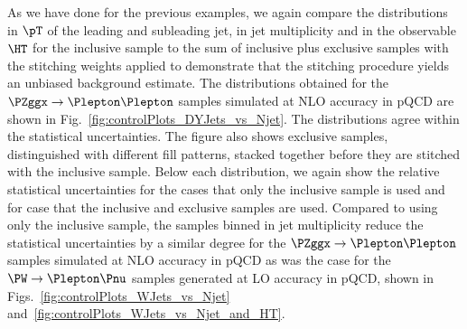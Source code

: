 As we have done for the previous examples, we again compare the distributions in $\pT$ of the leading and subleading jet,
in jet multiplicity and in the observable $\HT$ 
for the inclusive sample to the sum of inclusive plus exclusive samples with the stitching weights applied
to demonstrate that the stitching procedure yields an unbiased background estimate.
The distributions  obtained for the $\PZggx \to \Plepton\Plepton$ samples simulated at NLO accuracy in pQCD are shown in Fig.~\ref{fig:controlPlots_DYJets_vs_Njet}.
The distributions agree within the statistical uncertainties.
The figure also shows exclusive samples, distinguished with different fill patterns, stacked together before they are stitched with the inclusive sample.
Below each distribution, we again show the relative statistical uncertainties for the cases that only the inclusive sample is used
and for case that the inclusive and exclusive samples are used.
Compared to using only the inclusive sample,
the samples binned in jet multiplicity reduce the statistical uncertainties by a similar degree 
for the $\PZggx \to \Plepton\Plepton$ samples simulated at NLO accuracy in pQCD 
as was the case for the $\PW \to \Plepton\Pnu$ samples generated at LO accuracy in pQCD,
shown in Figs.~\ref{fig:controlPlots_WJets_vs_Njet} and~\ref{fig:controlPlots_WJets_vs_Njet_and_HT}.

